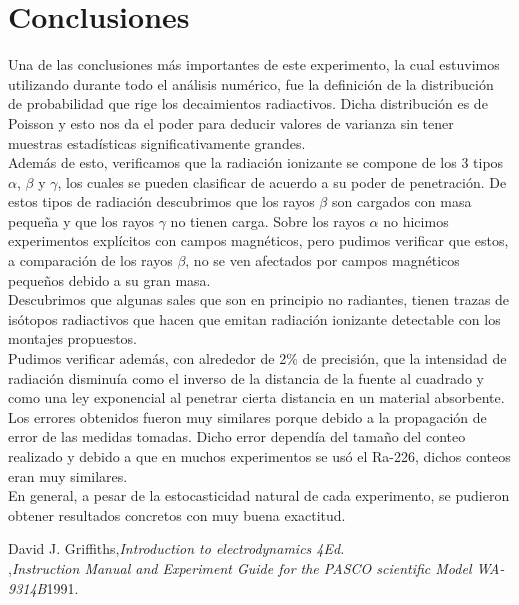 \documentclass[%
 reprint,
 amsmath,amssymb,
 aps,
]{revtex4-1}
\begin{document}
\section{\label{sec:level1}Conclusiones}
Una de las conclusiones más importantes de este experimento, la cual estuvimos utilizando durante todo el análisis numérico, fue la definición de la distribución de probabilidad que rige los decaimientos radiactivos. Dicha distribución es de Poisson y esto nos da el poder para deducir valores de varianza sin tener muestras estadísticas significativamente grandes.\\

Además de esto, verificamos que la radiación ionizante se compone de los 3 tipos $\alpha$, $\beta$ y $\gamma$, los cuales se pueden clasificar de acuerdo a su poder de penetración. De estos tipos de radiación descubrimos que los rayos $\beta$ son cargados con masa pequeña y que los rayos $\gamma$ no tienen carga. Sobre los rayos $\alpha$ no hicimos experimentos explícitos con campos magnéticos, pero pudimos verificar que estos, a comparación de los rayos  $\beta$, no se ven afectados por campos magnéticos pequeños debido a su gran masa.\\

Descubrimos que algunas sales que son en principio no radiantes, tienen trazas de isótopos radiactivos que hacen que emitan radiación ionizante detectable con los montajes propuestos.\\

Pudimos verificar además, con alrededor de 2\% de precisión, que la intensidad de radiación disminuía como el inverso de la distancia de la fuente al cuadrado y como una ley exponencial al penetrar cierta distancia en un material absorbente.\\

Los errores obtenidos fueron muy similares porque debido a la propagación de error de las medidas tomadas. Dicho error dependía del tamaño del conteo realizado y debido a que en muchos experimentos se usó el Ra-226, dichos conteos eran muy similares.\\

En general, a pesar de la estocasticidad natural de cada experimento, se pudieron obtener resultados concretos con muy buena exactitud.\\




\begin{thebibliography}{99} 
 David J. Griffiths,{\it Introduction to electrodynamics 4Ed.}\\ 
 ,{\it Instruction Manual and Experiment Guide for the PASCO scientific Model WA-9314B}{1991}.\\ 
\end{thebibliography}
\end{document}
